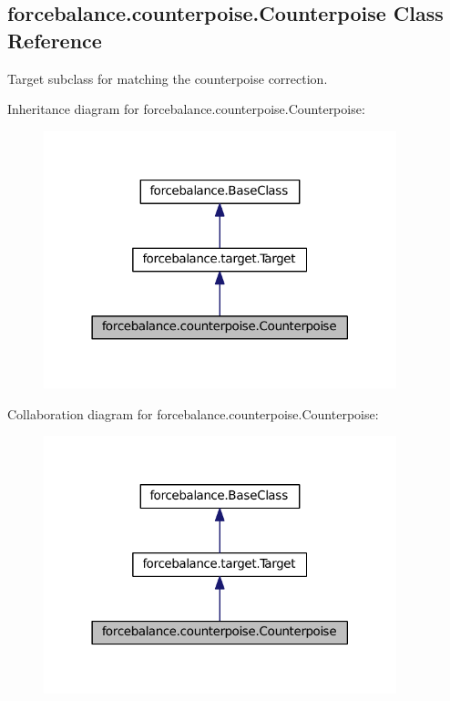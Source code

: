 \hypertarget{classforcebalance_1_1counterpoise_1_1Counterpoise}{\subsection{forcebalance.\-counterpoise.\-Counterpoise \-Class \-Reference}
\label{classforcebalance_1_1counterpoise_1_1Counterpoise}
}


\-Target subclass for matching the counterpoise correction.  




\-Inheritance diagram for forcebalance.\-counterpoise.\-Counterpoise\-:
\nopagebreak
\begin{figure}[H]
\begin{center}
\leavevmode
\includegraphics[width=290pt]{classforcebalance_1_1counterpoise_1_1Counterpoise__inherit__graph}
\end{center}
\end{figure}


\-Collaboration diagram for forcebalance.\-counterpoise.\-Counterpoise\-:
\nopagebreak
\begin{figure}[H]
\begin{center}
\leavevmode
\includegraphics[width=290pt]{classforcebalance_1_1counterpoise_1_1Counterpoise__coll__graph}
\end{center}
\end{figure}
